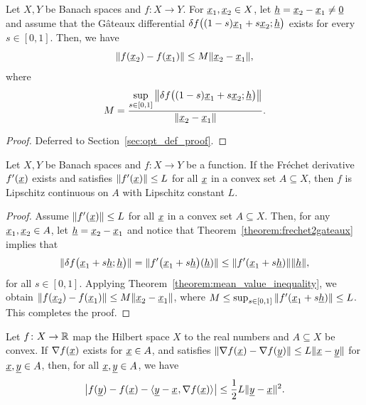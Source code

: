 \begin{theorem}
\label{theorem:mean_value_inequality}
Let \(X,Y\) be Banach spaces and \(f\colon X\to Y\).
For \(\underline{x}_1,\underline{x}_2\in X\), let $\underline{h}=\underline{x}_2-\underline{x}_1 \neq \underline{0}$
and assume that the G\^{a}teaux differential $\delta f\big((1-s)\underline{x}_1+s\underline{x}_2;\underline{h}\big)$ exists for every \(s\in[0,1]\).
Then, we have
\[
\|f(\underline{x}_2)-f(\underline{x}_1)\|
\leq
M\|\underline{x}_2-\underline{x}_1\|,
\]
where
\[
M
=
\frac{
\displaystyle
\sup_{s\in[0,1]}
\left\|
\delta f\big((1-s)\underline{x}_1+s\underline{x}_2;\underline{h}\big)
\right\|
}{
\|\underline{x}_2-\underline{x}_1\|
}.
\]
\end{theorem}

\begin{proof}
Deferred to Section~\ref{sec:opt_def_proof}.
\end{proof}


\begin{lemma}
Let $X,Y$ be Banach spaces and $f \colon X \rightarrow Y$ be a function.
If the Fr\'{e}chet derivative $f'(\underline{x})$ exists and satisfies $\| f'(\underline{x})\| \leq L$ for all $\underline{x}$ in a convex set $A\subseteq X$, then $f$ is Lipschitz continuous on $A$ with Lipschitz constant $L$.
\end{lemma}

\begin{proof}
Assume $\| f'(\underline{x})\| \leq L$ for all $\underline{x}$ in a convex set $A\subseteq X$.
Then, for any $\underline{x}_1 , \underline{x}_2 \in A$, let $\underline{h} = \underline{x}_2 - \underline{x}_1$ and notice that Theorem~\ref{theorem:frechet2gateaux} implies that
\[ \| \delta f \big( \underline{x}_1+s\underline{h}; \underline{h}\big) \|  = \| f'\big( \underline{x}_1+s\underline{h} \big)(\underline{h}) \| \leq \| f'(\underline{x}_1 + s \underline{h})\| \|\underline{h} \|, \] 
for all $s\in [0,1]$.
Applying Theorem~\ref{theorem:mean_value_inequality}, we obtain $\|f(\underline{x}_2)-f(\underline{x}_1)\|\leq M\|\underline{x}_2-\underline{x}_1\|$, where $M\leq\sup_{s\in[0,1]}\|f'(\underline{x}_1+s\underline h)\|\leq L$.
This completes the proof.
\end{proof}

\begin{lemma}
Let $f \colon X \rightarrow \mathbb{R}$ map the Hilbert space $X$ to the real numbers and $A\subseteq X$ be convex.
If $\nabla f(\underline{x})$ exists for $\underline{x}\in A$, and satisfies $ \| \nabla f(\underline{x}) - \nabla f(\underline{y}) \| \leq L \| \underline{x} - \underline{y} \|$ for $\underline{x},\underline{y}\in A$, then, for all $\underline{x},\underline{y}\in A$, we have
\[ \big| f(\underline{y}) - f(\underline{x}) - {\langle \underline{y}-\underline{x}  \mskip1mu ,  \nabla f (\underline{x})  \rangle} \big| \leq \frac{1}{2} L \| \underline{y}-\underline{x} \|^2. \]
\end{lemma}

